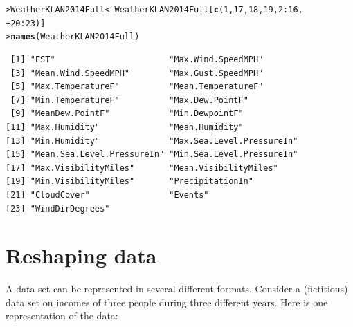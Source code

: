 \documentclass[12pt,oneside]{book}\usepackage[]{graphicx}\usepackage[]{color}
\makeatletter
\newcommand{\hlnum}[1]{\textcolor[rgb]{0.686,0.059,0.569}{#1}}%
\newcommand{\hlopt}[1]{\textcolor[rgb]{0,0,0}{#1}}%
\newcommand{\hlstd}[1]{\textcolor[rgb]{0.345,0.345,0.345}{#1}}%
\newcommand{\hlkwb}[1]{\textcolor[rgb]{0.69,0.353,0.396}{#1}}%
\newcommand{\hlkwd}[1]{\textcolor[rgb]{0.737,0.353,0.396}{\textbf{#1}}}%
\newenvironment{kframe}{%
 \def\at@end@of@kframe{}%
 \ifinner\ifhmode%
  \def\at@end@of@kframe{\end{minipage}}%
  \begin{minipage}{\columnwidth}%
 \fi\fi%
 \def\FrameCommand##1{\hskip\@totalleftmargin \hskip-\fboxsep
 \colorbox{shadecolor}{##1}\hskip-\fboxsep
     \hskip-\linewidth \hskip-\@totalleftmargin \hskip\columnwidth}%
 \MakeFramed {\advance\hsize-\width
   \@totalleftmargin\z@ \linewidth\hsize
   \@setminipage}}%
 {\par\unskip\endMakeFramed%
 \at@end@of@kframe}
\newenvironment{knitrout}{}{} %
\makeatother
\begin{document}
\begin{knitrout}
\color{fgcolor}\begin{kframe}
\begin{alltt}
\hlstd{> }\hlstd{WeatherKLAN2014Full} \hlkwb{<-} \hlstd{WeatherKLAN2014Full[}\hlkwd{c}\hlstd{(}\hlnum{1}\hlstd{,} \hlnum{17}\hlstd{,} \hlnum{18}\hlstd{,} \hlnum{19}\hlstd{,} \hlnum{2}\hlopt{:}\hlnum{16}\hlstd{,}
\hlstd{+ }    \hlnum{20}\hlopt{:}\hlnum{23}\hlstd{)]}
\hlstd{> }\hlkwd{names}\hlstd{(WeatherKLAN2014Full)}
\end{alltt}
\begin{verbatim}
 [1] "EST"                       "Max.Wind.SpeedMPH"        
 [3] "Mean.Wind.SpeedMPH"        "Max.Gust.SpeedMPH"        
 [5] "Max.TemperatureF"          "Mean.TemperatureF"        
 [7] "Min.TemperatureF"          "Max.Dew.PointF"           
 [9] "MeanDew.PointF"            "Min.DewpointF"            
[11] "Max.Humidity"              "Mean.Humidity"            
[13] "Min.Humidity"              "Max.Sea.Level.PressureIn" 
[15] "Mean.Sea.Level.PressureIn" "Min.Sea.Level.PressureIn" 
[17] "Max.VisibilityMiles"       "Mean.VisibilityMiles"     
[19] "Min.VisibilityMiles"       "PrecipitationIn"          
[21] "CloudCover"                "Events"                   
[23] "WindDirDegrees"           
\end{verbatim}
\end{kframe}
\end{knitrout}

\section{Reshaping data}
A data set can be represented in several different formats. Consider a (fictitious) data set on incomes of three people during three different years. Here is one representation of the data:
\end{document}
